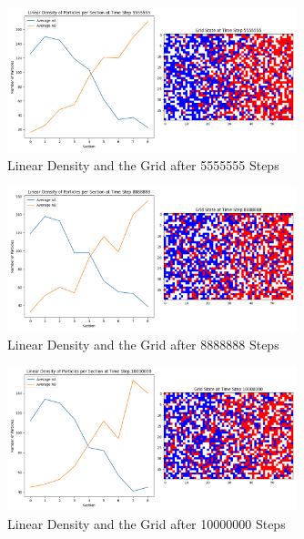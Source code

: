 \documentclass[11pt]{article}
\begin{document}
\begin{figure}[H]
    \centering
    \includegraphics[width=0.75\textwidth, keepaspectratio]{Linear_Density_Grid_After_5555555_Steps_1_Trial.png}
    \caption{Linear Density and the Grid after 5555555 Steps}
    \label{fig:24}
\end{figure}

\begin{figure}[H]
    \centering
    \includegraphics[width=0.75\textwidth, keepaspectratio]{Linear_Density_Grid_After_8888888_Steps_1_Trial.png}
    \caption{Linear Density and the Grid after 8888888 Steps}
    \label{fig:25}
\end{figure}

\begin{figure}[H]
    \centering
    \includegraphics[width=0.75\textwidth, keepaspectratio]{Linear_Density_Grid_After_10000000_Steps_1_Trial.png}
    \caption{Linear Density and the Grid after 10000000 Steps}
    \label{fig:26}
\end{figure}
\end{document}
